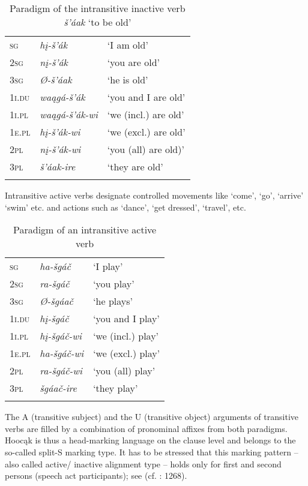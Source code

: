 \documentclass[output=paper]{langscibook}
\begin{document}
\begin{table}
	\begin{tabular}{lll}
\lsptoprule
1\textsc{sg} & \textit{hį-š'ák}  & `I am old'\\
2\textsc{sg} & \textit{nį-š'ák}  & `you are old'\\
3\textsc{sg} & \textit{Ø-š'áak} & `he is old'\\
1\textsc{i.du} & \textit{waągá-š'ák} & `you and I are old'\\
1\textsc{i.pl} & \textit{waągá-š'ák-wi} & `we (incl.) are old'\\
1\textsc{e.pl} & \textit{hį-š'ák-wi}  & `we (excl.) are old'\\
2\textsc{pl} & \textit{nį-š'ák-wi} & `you (all) are old)'\\
3\textsc{pl} & \textit{š'áak-ire} & `they are old'\\
\lspbottomrule
\end{tabular}
\caption{Paradigm of the intransitive inactive verb \textit{š'áak} `to be old'}\label{tab:Helmbrecht:2}
\end{table}

Intransitive active verbs designate controlled movements like `come', `go', `arrive' `swim' etc. and actions such as `dance', `get dressed', `travel', etc. 


\begin{table}
\begin{tabular}{lll}
\lsptoprule
1\textsc{sg} & \textit{ha-šgáč} & `I play'\\
2\textsc{sg} & \textit{ra-šgáč} & `you play'\\
3\textsc{sg} & \textit{Ø-šgáač} & `he plays'\\
1\textsc{i.du} & \textit{hį-šgáč} & `you and I play'\\
1\textsc{i.pl} & \textit{hį-šgáč-wi} & `we (incl.) play'\\
1\textsc{e.pl} & \textit{ha-šgáč-wi} & `we (excl.) play'\\
2\textsc{pl} & \textit{ra-šgáč-wi} & `you (all) play'\\
3\textsc{pl} & \textit{šgáač-ire} & `they play'\\
\lspbottomrule
\end{tabular}
\caption{Paradigm of an intransitive active verb}\label{tab:Helmbrecht:3}
\end{table}


The A (transitive subject) and the U (transitive object) arguments of transitive verbs are filled by a combination of pronominal affixes from both paradigms. Hoocąk is thus a head-marking language on the clause level and belongs to the so-called split-S marking type. It has to be stressed that this marking pattern – also called active/ inactive alignment type – holds only for first and second persons (speech act participants); see  (cf. \citealt{Hartmann2013}: 1268).
\end{document}
